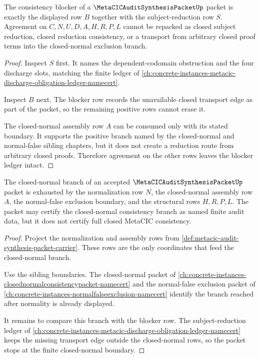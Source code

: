 \begin{theorem}
\label{thm:metacic-audit-synthesis-consistency-blocker-ledger}
The consistency blocker of a $\MetaCICAuditSynthesisPacketUp$ packet is exactly the displayed row $B$ together with the subject-reduction row $S$. Agreement on $C,N,U,D,A,H,R,P,L$ cannot be repacked as closed subject reduction, closed reduction consistency, or a transport from arbitrary closed proof terms into the closed-normal exclusion branch.
\end{theorem}
\begin{proof}
Inspect $S$ first. It names the dependent-codomain obstruction and the four discharge slots, matching the finite ledger of \autoref{ch:concrete-instances-metacic-discharge-obligation-ledger-namecert}.

Inspect $B$ next. The blocker row records the unavailable closed transport edge as part of the packet, so the remaining positive rows cannot erase it.

The closed-normal assembly row $A$ can be consumed only with its stated boundary. It supports the positive branch named by the closed-normal and normal-false sibling chapters, but it does not create a reduction route from arbitrary closed proofs. Therefore agreement on the other rows leaves the blocker ledger intact.
\end{proof}

\begin{theorem}
\label{thm:metacic-audit-synthesis-closed-normal-boundary}
The closed-normal branch of an accepted $\MetaCICAuditSynthesisPacketUp$ packet is exhausted by the normalization row $N$, the closed-normal assembly row $A$, the normal-false exclusion boundary, and the structural rows $H,R,P,L$. The packet may certify the closed-normal consistency branch as named finite audit data, but it does not certify full closed MetaCIC consistency.
\end{theorem}
\begin{proof}
Project the normalization and assembly rows from \autoref{def:metacic-audit-synthesis-packet-carrier}. These rows are the only coordinates that feed the closed-normal branch.

Use the sibling boundaries. The closed-normal packet of \autoref{ch:concrete-instances-closednormalconsistencypacket-namecert} and the normal-false exclusion packet of \autoref{ch:concrete-instances-normalfalseexclusion-namecert} identify the branch reached after normality is already displayed.

It remains to compare this branch with the blocker row. The subject-reduction ledger of \autoref{ch:concrete-instances-metacic-discharge-obligation-ledger-namecert} keeps the missing transport edge outside the closed-normal rows, so the packet stops at the finite closed-normal boundary.
\end{proof}

